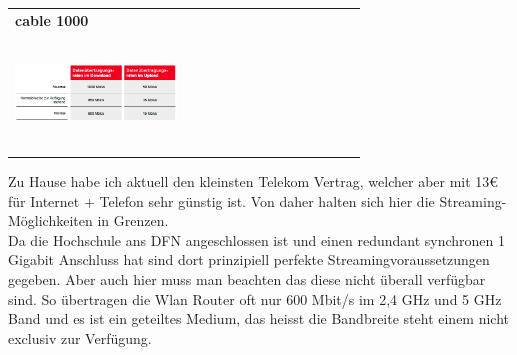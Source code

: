\begin{table}[ht]
\begin{center}
\begin{tabular}{>{\centering}p{} >{\centering}p{}}
        \textbf{cable 1000} \\ \includegraphics[width=0.5\textwidth, height=3cm]{./pictures/voda1000.png} &  \tabularnewline
  \end{tabular}
  \end{center}
\end{table}
\clearpage


\newpage
{}

Zu Hause habe ich aktuell den kleinsten Telekom Vertrag, welcher aber mit 13€ für Internet + Telefon sehr günstig ist.
Von daher halten sich hier die Streaming-Möglichkeiten in Grenzen. \\
Da die Hochschule ans DFN angeschlossen ist und einen redundant synchronen 1 Gigabit Anschluss hat sind dort prinzipiell perfekte Streamingvoraussetzungen gegeben. Aber auch hier muss man beachten das diese nicht überall verfügbar sind. So übertragen die Wlan Router oft nur 600 Mbit/s im 2,4 GHz und 5 GHz Band und es ist ein geteiltes Medium, das heisst die Bandbreite steht einem nicht exclusiv zur Verfügung.

